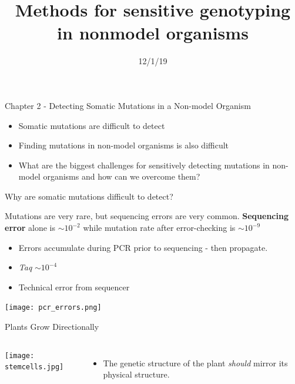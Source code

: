 \documentclass{beamer}
\title[Sensitive Genotyping]{Methods for sensitive genotyping in nonmodel organisms}
\date{12/1/19}
\author{Adam Orr\hskip 1em \faicon{twitter}@AdamJOrr}
\begin{document}
\frame{\titlepage}

\begin{frame}{Chapter 2 - Detecting Somatic Mutations in a Non-model Organism}
\begin{itemize}
\item Somatic mutations are difficult to detect
\item Finding mutations in non-model organisms is also difficult
\item What are the biggest challenges for sensitively detecting mutations in non-model organisms and how can we overcome them?
\end{itemize}
\end{frame}

\begin{frame}{Why are somatic mutations difficult to detect?}

\begin{block}{Mutations are very rare, but sequencing errors are very common.}
\textbf{Sequencing error} alone is \textbf{$\sim10^{-2}$} while mutation rate after error-checking is \textbf{$\sim10^{-9}$}
\end{block}

\begin{itemize}
\item Errors accumulate during PCR prior to sequencing - then propagate.
\item \textit{Taq} $\sim10^{-4}$
\item Technical error from sequencer
\end{itemize}

\texttt{[image: pcr\_errors.png]}

\end{frame}

\begin{frame}{Plants Grow Directionally}
\begin{columns}
		\texttt{[image: stemcells.jpg]}
		\begin{itemize}
			\item The genetic structure of the plant \textit{should} mirror its physical structure.
		\end{itemize}
\end{columns}
\end{frame}
\end{document}
